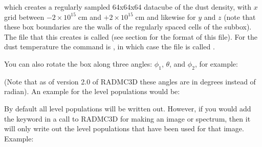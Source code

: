 \documentclass[letterpaper,10pt,english]{sphinxmanual}
\begin{document}
which creates a regularly sampled 64x64x64 datacube of the dust density, with \(x\) grid
between \(-2\times 10^{15}\;\mathrm{cm}\) and  \(+2\times 10^{15}\;\mathrm{cm}\) and
likewise for \(y\) and \(z\) (note that these box boundaries are the walls of the
regularly spaced cells of the subbox). The file that this creates is called 
(see section {\hyperref[\detokenize{toolsinside:sec-subbox-file-format}]{}} for the format of this file).
For the dust temperature the command is
, in which case the file is called
.

You can also rotate the box along three angles: \(\phi_1\), \(\theta\),
and \(\phi_2\), for example:

\begin{sphinxVerbatim}[commandchars=\\\{\}]
                   
\end{sphinxVerbatim}

(Note that as of version 2.0 of RADMC\sphinxhyphen{}3D these angles are in degrees instead of radian).
An example for the level populations would be:

\begin{sphinxVerbatim}[commandchars=\\\{\}]
            
\end{sphinxVerbatim}

 By default all level populations will
be written out. However, if you would add the  keyword in a
call to RADMC\sphinxhyphen{}3D for making an image or spectrum, then it will only write out
the level populations that have been used for that image. Example:
\end{document}
